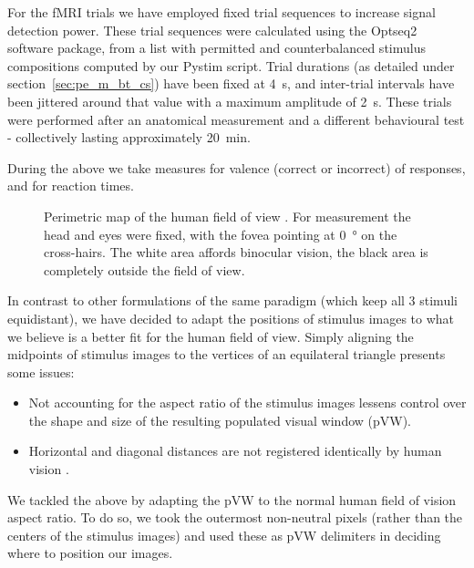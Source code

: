 	For the fMRI trials we have employed fixed trial sequences to increase signal detection power.
	These trial sequences were calculated using the Optseq2 \citep{optseq} software package, from a list with permitted and counterbalanced stimulus compositions computed by our Pystim \citep{pystim} script.
	Trial durations (as detailed under section~\ref{sec:pe_m_bt_cs}) have been fixed at \SI{4}{\second}, and inter-trial intervals have been jittered around that value with a maximum amplitude of \SI{2}{\second}.
	These trials were performed after an anatomical measurement and a different behavioural test - collectively lasting approximately \SI{20}{\minute}.
	
	During the above we take measures for valence (correct or incorrect) of responses, and for reaction times.
	
	\begin{wrapfigure}{r}{0.45\textwidth}
	  \centering
	    \caption{Perimetric map of the human field of view \citep{Ruch1960}.
	    For measurement the head and eyes were fixed, with the fovea pointing at \SI{0}{\degree} on the cross-hairs.
	    The white area affords binocular vision, the black area is completely outside the field of view.}
	    \label{fig:m_b_1}
	    \vspace{-1.0cm}
	\end{wrapfigure}
	
	In contrast to other formulations\citep{Hariri2000,Hariri2003} of the same paradigm (which keep all 3 stimuli equidistant),
	we have decided to adapt the positions of stimulus images to what we believe is a better fit for the human field of view.
	Simply aligning the midpoints of stimulus images to the vertices of an equilateral triangle presents some issues:
	\begin{itemize}
	    \item Not accounting for the aspect ratio of the stimulus images lessens control over the shape and size of the resulting populated visual window (pVW).
	    \item Horizontal and diagonal distances are not registered identically by human vision \citep{TerryBahill1975}.
	\end{itemize}
	
	We tackled the above by adapting the pVW to the normal human field of vision aspect ratio.
	To do so, we took the outermost non-neutral pixels (rather than the centers of the stimulus images) and used these as pVW delimiters in deciding where to position our images.
	
